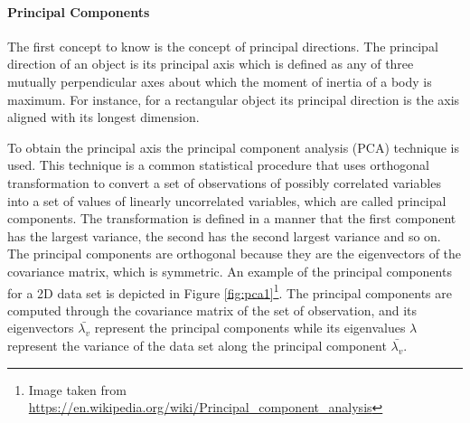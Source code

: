 \paragraph{Principal Components}
The first concept to know is the concept of principal directions. The principal direction of an object is its principal axis which is defined as any of three mutually perpendicular axes about which the moment of inertia of a body is maximum. For instance, for a rectangular object its principal direction is the axis aligned with its longest dimension. 

To obtain the principal axis the principal component analysis (PCA) \citep{PCA} technique is used. This technique is a common statistical procedure that uses orthogonal transformation to convert a set of  observations of possibly correlated variables into a set of values of linearly uncorrelated variables, which are called principal components. The transformation is defined in a manner that the first component has the largest variance, the second has the second largest variance and so on. The principal components are orthogonal because they are the eigenvectors of the covariance matrix, which is symmetric. An example of the principal components for a 2D data set is depicted in Figure \ref{fig:pca1}\footnote{Image taken from \href{https://en.wikipedia.org/wiki/Principal_component_analysis}{https://en.wikipedia.org/wiki/Principal\_component\_analysis}}. The principal components are computed through the covariance matrix of the set of observation, and its eigenvectors $\bar{\lambda_v}$ represent the principal components while its eigenvalues $\lambda$ represent the variance of the data set along the principal component $\bar{\lambda_v}$. 

